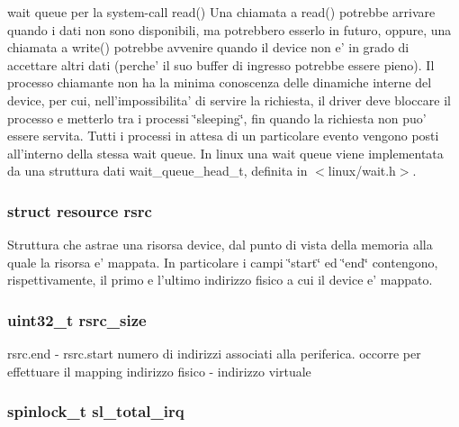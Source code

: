 wait queue per la system-\/call read() Una chiamata a read() potrebbe arrivare quando i dati non sono disponibili, ma potrebbero esserlo in futuro, oppure, una chiamata a write() potrebbe avvenire quando il device non e' in grado di accettare altri dati (perche' il suo buffer di ingresso potrebbe essere pieno). Il processo chiamante non ha la minima conoscenza delle dinamiche interne del device, per cui, nell'impossibilita' di servire la richiesta, il driver deve bloccare il processo e metterlo tra i processi \char`\"{}sleeping\char`\"{}, fin quando la richiesta non puo' essere servita. Tutti i processi in attesa di un particolare evento vengono posti all'interno della stessa wait queue. In linux una wait queue viene implementata da una struttura dati wait\+\_\+queue\+\_\+head\+\_\+t, definita in $<$linux/wait.\+h$>$. \hypertarget{structmy_g_p_i_o_k__t_a565a1848c3ae8026257a74cf169c6941}{
\subsubsection[{rsrc}]{\setlength{\rightskip}{0pt plus 5cm}struct resource rsrc}}\label{structmy_g_p_i_o_k__t_a565a1848c3ae8026257a74cf169c6941}
Struttura che astrae una risorsa device, dal punto di vista della memoria alla quale la risorsa e' mappata. In particolare i campi \char`\"{}start\char`\"{} ed \char`\"{}end\char`\"{} contengono, rispettivamente, il primo e l'ultimo indirizzo fisico a cui il device e' mappato. \hypertarget{structmy_g_p_i_o_k__t_a0f87b53dc5049a349ef01aa586c0b5dc}{
\subsubsection[{rsrc\+\_\+size}]{\setlength{\rightskip}{0pt plus 5cm}uint32\+\_\+t rsrc\+\_\+size}}\label{structmy_g_p_i_o_k__t_a0f87b53dc5049a349ef01aa586c0b5dc}
rsrc.\+end -\/ rsrc.\+start numero di indirizzi associati alla periferica. occorre per effettuare il mapping indirizzo fisico -\/ indirizzo virtuale \hypertarget{structmy_g_p_i_o_k__t_ac41bbc7fe03ef25b7f468275fb565d78}{
\subsubsection[{sl\+\_\+total\+\_\+irq}]{\setlength{\rightskip}{0pt plus 5cm}spinlock\+\_\+t sl\+\_\+total\+\_\+irq}}\label{structmy_g_p_i_o_k__t_ac41bbc7fe03ef25b7f468275fb565d78}

